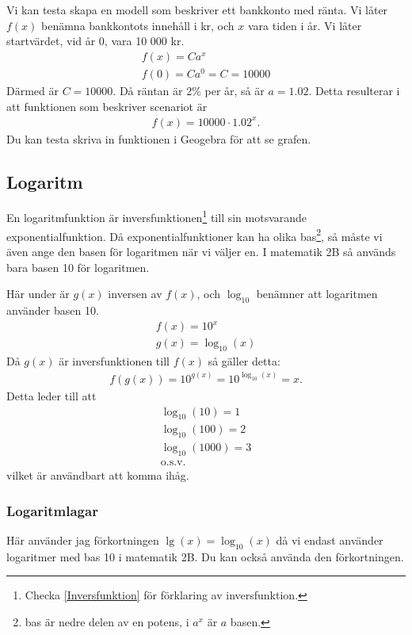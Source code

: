 Vi kan testa skapa en modell som beskriver ett bankkonto med ränta. Vi låter $f(x)$ benämna bankkontots innehåll i kr, och $x$ vara tiden i år. Vi låter startvärdet, vid år 0, vara 10 000 kr.
\begin{align*}
	f(x)=Ca^x \\
	f(0)=Ca^0 = C = 10000
\end{align*}
Därmed är $C = 10000$. Då räntan är 2\% per år, så är $a=1.02$. Detta resulterar i att funktionen som beskriver scenariot är
\begin{align*}
	f(x)=10000\cdot1.02^x.
\end{align*}
Du kan testa skriva in funktionen i Geogebra för att se grafen.

\newpage
\subsection{Logaritm}

En logaritmfunktion är inversfunktionen\footnote{Checka \ref{Inversfunktion} för förklaring av inversfunktion.} till sin motsvarande exponentialfunktion. Då exponentialfunktioner kan ha olika bas\footnote{bas är nedre delen av en potens, i $a^x$ är $a$ basen.}, så måste vi även ange den basen för logaritmen när vi väljer en. I matematik 2B så används bara basen 10 för logaritmen.

Här under är $g(x)$ inversen av $f(x)$, och $\log_{10}$ benämner att logaritmen använder basen 10.
\begin{align}
	f(x) = 10^x \\
	g(x) = \log_{10}(x)
\end{align}
Då $g(x)$ är inversfunktionen till $f(x)$ så gäller detta:
\begin{align}
	f(g(x)) = 10^{g(x)} = 10^{\log_{10}(x)} = x.
\end{align}
Detta leder till att
\begin{align}
	\log_{10}(10) = 1 \\
	\log_{10}(100) = 2 \\
	\log_{10}(1000) = 3 \\
	\text{o.s.v.}
\end{align}
vilket är användbart att komma ihåg.

\newpage
\subsubsection{Logaritmlagar}

Här använder jag förkortningen $\lg(x) = \log_{10}(x)$ då vi endast använder logaritmer med bas 10 i matematik 2B. Du kan också använda den förkortningen.

